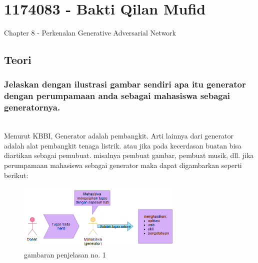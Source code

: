 \section{1174083 - Bakti Qilan Mufid}
Chapter 8 - Perkenalan Generative Adversarial Network
\subsection{Teori}
\subsubsection{Jelaskan dengan ilustrasi gambar sendiri apa itu generator dengan perumpamaan anda sebagai mahasiswa sebagai generatornya.}
\hfill\\
Menurut KBBI, Generator adalah pembangkit. Arti lainnya dari generator adalah alat pembangkit tenaga listrik. atau jika pada kecerdasan buatan bisa diartikan sebagai pemubuat. misalnya pembuat gambar, pembuat musik, dll. jika perumpamaan mahasiswa sebagai generator maka dapat digambarkan seperti berikut:
\begin{figure}[H]
	\centering
	\includegraphics[width=8cm]{figures/1174083/figures8/1.png}
	\caption{gambaran penjelasan no. 1}
\end{figure}

